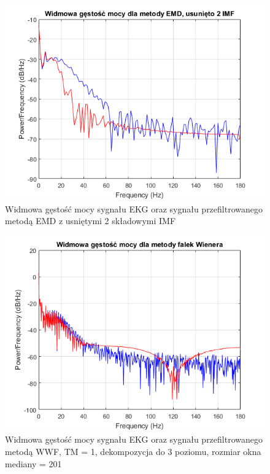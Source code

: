 \begin{figure}[H]
  \begin{center}
    \includegraphics[scale=0.9]
    {img/PSD_EMD_2discarded.png}
  \end{center}
  \caption{Widmowa gęstość mocy sygnału EKG oraz sygnału przefiltrowanego metodą EMD z usniętymi 2 składowymi IMF}
  \label{rys:emd2}
\end{figure}

\begin{figure}[H]
  \begin{center}
    \includegraphics[scale=0.9]
    {img/PSD_WWF1.png}
  \end{center}
  \caption{Widmowa gęstość mocy sygnału EKG oraz sygnału przefiltrowanego metodą WWF, TM = 1, dekompozycja do 3 poziomu, rozmiar okna mediany = 201}
  \label{rys:wwf}
\end{figure}

